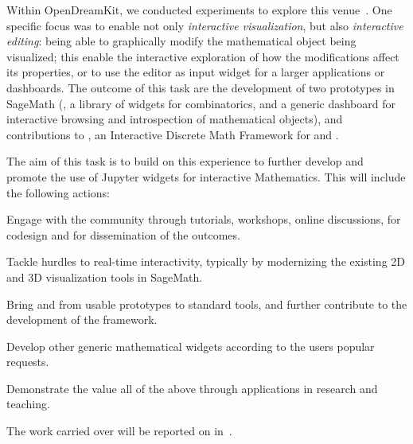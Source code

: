 \begin{task}[
  title=Application: Interactive Mathematics with Jupyter Widgets,
  id=math,
  lead=UPSUD,
  PM=17, %
  wphases={0-36},
  partners={UPSUD,QS}
  ]
  Within OpenDreamKit, we conducted experiments to explore this
  venue~\cite{ODK_D4.16}. One specific focus was to enable not only
  \emph{interactive visualization}, but also \emph{interactive
    editing}: being able to graphically modify the mathematical object
  being visualized; this enable the interactive exploration of how the
  modifications affect its properties, or to use the editor as input
  widget for a larger applications or dashboards. The outcome of this
  task are the development of two prototypes in SageMath
  (, a library of widgets for
  combinatorics, and  a generic dashboard for
  interactive browsing and introspection of mathematical objects), and
  contributions to , an Interactive Discrete Math
  Framework for  and .

  The aim of this task is to build on this experience to further
  develop and promote the use of Jupyter widgets for interactive
  Mathematics. This will include the following actions:
  \begin{compactitem}
  \item Engage with the community through tutorials, workshops, online
    discussions, for codesign and for dissemination of the outcomes.
  \item Tackle hurdles to real-time interactivity, typically by
    modernizing the existing 2D and 3D visualization tools in
    SageMath. %
  \item Bring  and
     from usable prototypes to standard tools,
    and further contribute to the development of the 
    framework.
  \item Develop other generic mathematical widgets according to the
    users popular requests.
  \item Demonstrate the value all of the above through applications in
    research and teaching.
  \end{compactitem}
  The work carried over will be reported on in~.
\end{task}
